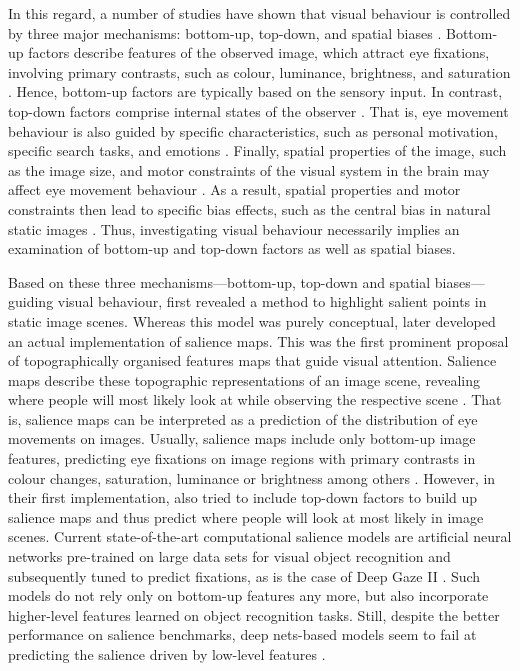 {In this regard, a number of studies have shown that visual behaviour is controlled by three major mechanisms: bottom-up, top-down, and spatial biases \citep{desimone1995visualattention, egeth1997visualattention, kastner2000visualattention, corbetta2002topdownbottomup, connor2004buttomuptopdown, kollmorgen2010topdownbottomup}. Bottom-up factors describe features of the observed image, which attract eye fixations, involving primary contrasts, such as colour, luminance, brightness, and saturation \citep{itti1998salience, reinagel1999bottomup, baddeley2006bottomup}. Hence, bottom-up factors are typically based on the sensory input. In contrast, top-down factors comprise internal states of the observer \citep{connor2004buttomuptopdown, kaspar2013visualattention}. That is, eye movement behaviour is also guided by specific characteristics, such as personal motivation, specific search tasks, and emotions \citep{wadlinger2006topdown, einhauser2008topdown, rauthmann2012topdown, kaspar2012topdown}. Finally, spatial properties of the image, such as the image size, and motor constraints of the visual system in the brain may affect eye movement behaviour \citep{ramosgameiro2017explorationexploitation, ossandon2014spatialbiases}. As a result, spatial properties and motor constraints then lead to specific bias effects, such as the central bias in natural static images \citep{tatler2007centralbias}. Thus, investigating visual behaviour necessarily implies an examination of bottom-up and top-down factors as well as spatial biases. 

Based on these three mechanisms---bottom-up, top-down and spatial biases---guiding visual behaviour, \citet{koch1987salience} first revealed a method to highlight salient points in static image scenes. Whereas this model was purely conceptual, \citet{niebur1996salience} later developed an actual implementation of salience maps. This was the first prominent proposal of topographically organised features maps that guide visual attention. Salience maps describe these topographic representations of an image scene, revealing where people will most likely look at while observing the respective scene \citep{itti2001salience}. That is, salience maps can be interpreted as a prediction of the distribution of eye movements on images. Usually, salience maps include only bottom-up image features, predicting eye fixations on image regions with primary contrasts in colour changes, saturation, luminance or brightness among others \citep{itti1998salience}. However, in their first implementation, \citet{niebur1996salience} also tried to include top-down factors to build up salience maps and thus predict where people will look at most likely in image scenes. Current state-of-the-art computational salience models are artificial neural networks pre-trained on large data sets for visual object recognition and subsequently tuned to predict fixations, as is the case of Deep Gaze II \citep{kuemmerer2016deepgaze}. Such models do not rely only on bottom-up features any more, but also incorporate higher-level features learned on object recognition tasks. Still, despite the better performance on salience benchmarks, deep nets-based models seem to fail at predicting the salience driven by low-level features \citep{kuemmerer2017icfdeepgaze}.

}
